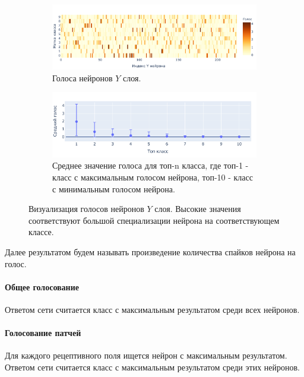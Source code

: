 \documentclass[a4paper]{article}
\begin{document}
\begin{figure}[H]
\centering
\begin{subfigure}{0.9\textwidth}
    \includegraphics[width=\textwidth,keepaspectratio=true]{votes_ru.pdf}
    \caption{Голоса нейронов $Y$ слоя.}
\end{subfigure} 
\begin{subfigure}{0.9\textwidth} 
    \includegraphics[width=\textwidth,keepaspectratio=true]{votes_distribution_ru.pdf}
    \caption{Среднее значение голоса для топ-n класса, где топ-1 - класс с максимальным голосом нейрона, топ-10 - класс с минимальным голосом нейрона.}
\end{subfigure}
\caption{Визуализация голосов нейронов $Y$ слоя. Высокие значения соответствуют большой специализации нейрона на соответствующем классе.}
\end{figure}

 Далее результатом будем называть произведение количества спайков нейрона на голос.

\paragraph{Общее голосование}
Ответом сети считается класс с максимальным результатом среди всех нейронов.

\paragraph{Голосование патчей}
Для каждого рецептивного поля ищется нейрон с максимальным результатом. Ответом сети считается класс с максимальным результатом среди этих нейронов. 
\end{document}
